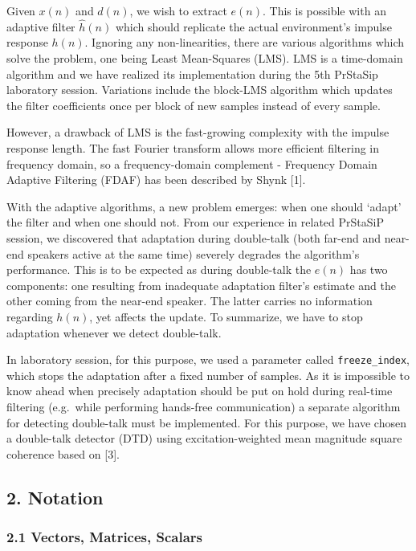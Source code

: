 \documentclass[11pt]{article}
\begin{document}
Given \(x(n)\) and \(d(n)\), we wish to extract \(e(n)\). This is
possible with an adaptive filter \(\hat{h}(n)\) which should replicate
the actual environment's impulse response \(h(n)\). Ignoring any
non-linearities, there are various algorithms which solve the problem,
one being Least Mean-Squares (LMS). LMS is a time-domain algorithm and
we have realized its implementation during the 5th PrStaSip laboratory
session. Variations include the block-LMS algorithm which updates the
filter coefficients once per block of new samples instead of every
sample.

However, a drawback of LMS is the fast-growing complexity with the
impulse response length. The fast Fourier transform allows more
efficient filtering in frequency domain, so a frequency-domain
complement - Frequency Domain Adaptive Filtering (FDAF) has been
described by Shynk {[}1{]}.

With the adaptive algorithms, a new problem emerges: when one should
`adapt' the filter and when one should not. From our experience in
related PrStaSiP session, we discovered that adaptation during
double-talk (both far-end and near-end speakers active at the same time)
severely degrades the algorithm's performance. This is to be expected as
during double-talk the \(e(n)\) has two components: one resulting from
inadequate adaptation filter's estimate and the other coming from the
near-end speaker. The latter carries no information regarding \(h(n)\),
yet affects the update. To summarize, we have to stop adaptation
whenever we detect double-talk.

In laboratory session, for this purpose, we used a parameter called
\texttt{freeze\_index}, which stops the adaptation after a fixed number
of samples. As it is impossible to know ahead when precisely adaptation
should be put on hold during real-time filtering (e.g.~while performing
hands-free communication) a separate algorithm for detecting double-talk
must be implemented. For this purpose, we have chosen a double-talk
detector (DTD) using excitation-weighted mean magnitude square coherence
based on {[}3{]}.

    \hypertarget{notation}{%
\subsection{2. Notation}\label{notation}}

\hypertarget{vectors-matrices-scalars}{%
\subsubsection{2.1 Vectors, Matrices,
Scalars}\label{vectors-matrices-scalars}}
\end{document}

